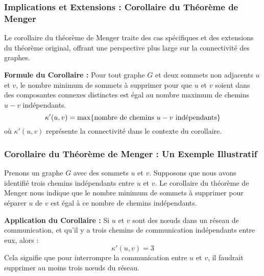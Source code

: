 \begin{frame}
\frametitle{\textbf{Implications et Extensions : Corollaire du Théorème de Menger}}
    \begin{tcolorbox}[colback=orange!10,colframe=orange!100!black,
        title=\textbf{Corollaire du Théorème de Menger (1927)}]
        Le corollaire du théorème de Menger traite des cas spécifiques et des extensions du théorème original, offrant une perspective plus large sur la connectivité des graphes.

        \textbf{Formule du Corollaire :}
        Pour tout graphe \( G \) et deux sommets non adjacents \( u \) et \( v \), le nombre minimum de sommets à supprimer pour que \( u \) et \( v \) soient dans des composantes connexes distinctes est égal au nombre maximum de chemins \( u-v \) indépendants.
        $$ \kappa'(u,v) = \max \{ \text{nombre de chemins \( u-v \) indépendants} \} $$
        où \( \kappa'(u,v) \) représente la connectivité dans le contexte du corollaire.
    \end{tcolorbox}
\end{frame}

\begin{frame}
\frametitle{\textbf{Corollaire du Théorème de Menger : Un Exemple Illustratif}}
    \begin{tcolorbox}[colback=orange!10,colframe=orange!100!black,
        title=\textbf{Application du Corollaire}]
        Prenons un graphe \( G \) avec des sommets \( u \) et \( v \). Supposons que nous avons identifié trois chemins indépendants entre \( u \) et \( v \). Le corollaire du théorème de Menger nous indique que le nombre minimum de sommets à supprimer pour séparer \( u \) de \( v \) est égal à ce nombre de chemins indépendants.

        \textbf{Application du Corollaire :}
        Si \( u \) et \( v \) sont des nœuds dans un réseau de communication, et qu'il y a trois chemins de communication indépendants entre eux, alors :
        $$ \kappa'(u,v) = 3 $$
        Cela signifie que pour interrompre la communication entre \( u \) et \( v \), il faudrait supprimer au moins trois nœuds du réseau.
    \end{tcolorbox}
\end{frame}


